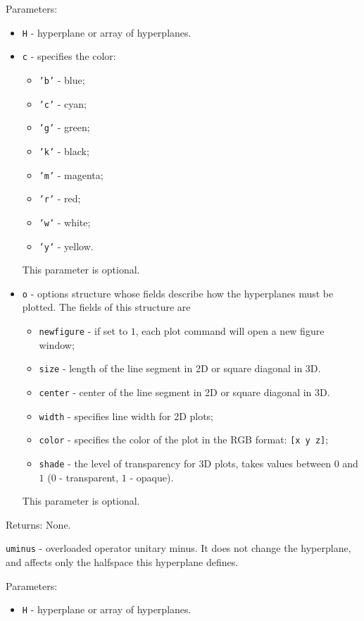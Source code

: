 \documentclass{report}
\begin{document}
Parameters:
\begin{itemize}
\item {\tt H} - hyperplane or array of hyperplanes.
\item {\tt c} - specifies the color:
\begin{itemize}
\item {\tt 'b'} - blue;
\item {\tt 'c'} - cyan;
\item {\tt 'g'} - green;
\item {\tt 'k'} - black;
\item {\tt 'm'} - magenta;
\item {\tt 'r'} - red;
\item {\tt 'w'} - white;
\item {\tt 'y'} - yellow.
\end{itemize}
This parameter is optional.
\item {\tt o} - options structure whose fields describe how the hyperplanes
must be plotted. The fields of this structure are
\begin{itemize}
\item {\tt newfigure} - if set to $1$, each plot command will open a new
figure window;
\item {\tt size} - length of the line segment in 2D or square diagonal in 3D.
\item {\tt center} - center of the line segment in 2D or square diagonal in 3D.
\item {\tt width} - specifies line width for 2D plots;
\item {\tt color} - specifies the color of the plot in the RGB format:
{\tt [x y z]};
\item {\tt shade} - the level of transparency for 3D plots, takes values
between $0$ and $1$ ($0$ - transparent, $1$ - opaque).
\end{itemize}
This parameter is optional.
\end{itemize}

Returns: None.

\newpage

{\Large {\tt uminus}} - overloaded operator unitary minus. It does not change
the hyperplane, and affects only the halfspace this hyperplane defines.

Parameters:
\begin{itemize}
\item {\tt H} - hyperplane or array of hyperplanes.
\end{itemize}
\end{document}
